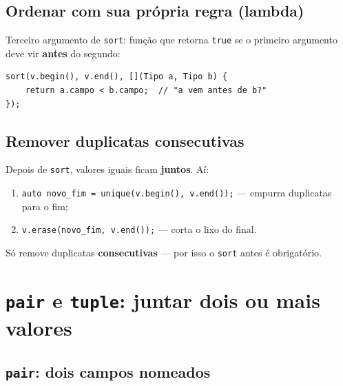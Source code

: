

\subsection{Ordenar com sua própria regra (lambda)}

Terceiro argumento de \texttt{sort}: função que retorna \texttt{true} se o primeiro argumento deve vir \textbf{antes} do segundo:

\begin{verbatim}
sort(v.begin(), v.end(), [](Tipo a, Tipo b) {
    return a.campo < b.campo;  // "a vem antes de b?"
});
\end{verbatim}

\subsection{Remover duplicatas consecutivas}

Depois de \texttt{sort}, valores iguais ficam \textbf{juntos}. Aí:

\begin{enumerate}[nosep]
  \item \texttt{auto novo\_fim = unique(v.begin(), v.end());} --- empurra duplicatas para o fim;
  \item \texttt{v.erase(novo\_fim, v.end());} --- corta o lixo do final.
\end{enumerate}

Só remove duplicatas \textbf{consecutivas} --- por isso o \texttt{sort} antes é obrigatório.


\section{\texttt{pair} e \texttt{tuple}: juntar dois ou mais valores}

\subsection{\texttt{pair}: dois campos nomeados}

